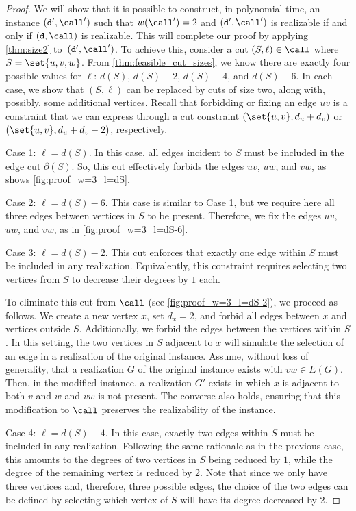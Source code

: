 \begin{proof}
    We will show that it is possible to construct, in polynomial time, an instance $(\texttt{d}', \call')$ such that $w(\call') = 2$ and $(\texttt{d}', \call')$ is realizable if and only if $(\texttt{d}, \call)$ is realizable.
    This will complete our proof by applying \cref{thm:size2} to~$(\texttt{d}', \call')$.
    To achieve this, consider a cut $(S, \ell) \in \call$ where $S = \set{u, v, w}$.
    From \cref{thm:feasible_cut_sizes}, we know there are exactly four possible values for $\ell$: $d(S)$, $d(S) - 2$, $d(S) - 4$, and $d(S) - 6$.
    In each case, we show that $(S, \ell)$ can be replaced by cuts of size two, along with, possibly, some additional vertices. 
    Recall that forbidding or fixing an edge $uv$ is a constraint that we can express through a cut constraint $(\set{u, v}, d_u + d_v)$ or $(\set{u, v}, d_u + d_v - 2)$, respectively.

    Case 1: $\ell = d(S)$.
    In this case, all edges incident to $S$ must be included in the edge cut $\partial(S)$. So, this cut effectively forbids the edges $uv$, $uw$, and $vw$, as shows \cref{fig:proof_w=3_l=dS}.

    Case 2: $\ell = d(S) - 6$.
    This case is similar to Case 1, but we require here all three edges between vertices in $S$ to be present. Therefore, we fix the edges $uv$, $uw$, and $vw$, as in \cref{fig:proof_w=3_l=dS-6}.

    Case 3: $\ell = d(S) - 2$.
    This cut enforces that exactly one edge within $S$ must be included in any realization. Equivalently, this constraint requires selecting two vertices from $S$ to decrease their degrees by $1$ each.

    To eliminate this cut from $\call$ (see \cref{fig:proof_w=3_l=dS-2}), we proceed as follows.
    We create a new vertex $x$, set $d_x = 2$, and forbid all edges between $x$ and vertices outside $S$.
    Additionally, we forbid the edges between the vertices within $S$.
    In this setting, the two vertices in $S$ adjacent to $x$ will simulate the selection of an edge in a realization of the original instance.
    Assume, without loss of generality, that a realization $G$ of the original instance exists with $vw \in E(G)$. Then, in the modified instance, a realization $G'$ exists in which $x$ is adjacent to both $v$ and $w$ and $vw$ is not present. The converse also holds, ensuring that this modification to $\call$ preserves the realizability of the instance.
    
    Case 4: $\ell = d(S) - 4$.
    In this case, exactly two edges within $S$ must be included in any realization.
    Following the same rationale as in the previous case, this amounts to the degrees of two vertices in $S$ being reduced by $1$, while the degree of the remaining vertex is reduced by $2$. Note that since we only have three vertices and, therefore, three possible edges, the choice of the two edges can be defined by selecting which vertex of $S$ will have its degree decreased by 2.


\end{proof}
